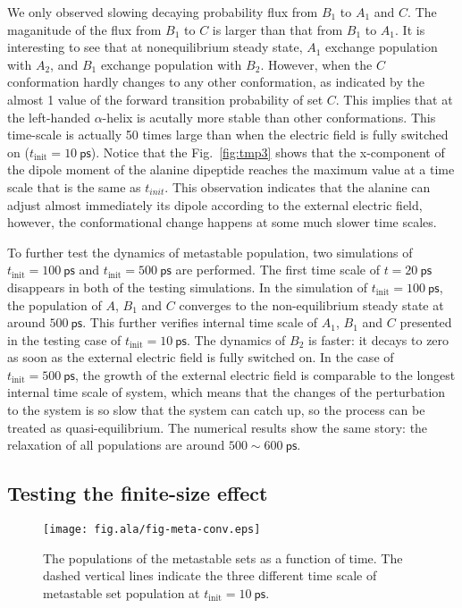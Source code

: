 \documentclass[aip,jcp,a4paper,preprint,onecolumn]{revtex4-1}
\begin{document}
We only observed slowing decaying probability flux from $B_1$ to $A_1$ and $C$.
The maganitude of the flux from $B_1$ to  $C$ is larger than that from  $B_1$ to  $A_1$.
It is interesting to see that at nonequilibrium steady state, $A_1$ exchange
population with $A_2$, and $B_1$ exchange
population with $B_2$. However, when the $C$ conformation hardly changes
to any other conformation, as indicated by the almost 1 value of the forward
transition probability of set $C$. This implies that at the left-handed $\alpha$-helix is
acutally more stable than  other conformations.
This time-scale is actually 50 times large than when the electric field
is fully switched on ($t_{\textrm{init}} = 10~\textsf{ps}$).
Notice that the Fig.~\ref{fig:tmp3}
shows that the x-component of the dipole moment of the alanine dipeptide
reaches the maximum value at a time scale  that is the same as
$t_{init}$. This observation indicates that the alanine can adjust almost immediately its
dipole according to the external electric field, however, the conformational change
happens at some much slower time scales.

To further test the dynamics of metastable population, two simulations
of $t_{\textrm{init}} = 100~\textsf{ps}$ and $t_{\textrm{init}} =
500~\textsf{ps}$ are performed. The first time scale of $t =
20~\textsf{ps}$ disappears in both of the testing simulations. In the
simulation of $t_{\textrm{init}} = 100~\textsf{ps}$, the population of
$A$, $B_1$ and $C$ converges to the non-equilibrium steady state at
around $500~\textsf{ps}$. This further verifies internal time scale of
$A_1$, $B_1$ and $C$ presented in the testing case of
$t_{\textrm{init}} = 10~\textsf{ps}$.  The dynamics of $B_2$ is
faster: it decays to zero as soon as the external electric field is fully
switched on. In the case of $t_{\textrm{init}} = 500~\textsf{ps}$, the
growth of the external electric field is comparable to the longest
internal time scale of system, which means that the changes of the
perturbation to the system is so slow that the system can catch up, so
the process can be treated as  quasi-equilibrium.
The numerical results show the same story: the relaxation
of all populations are around $500 \sim 600~\textsf{ps}$.


\subsection{Testing the finite-size effect}

\begin{figure}
  \centering
  \texttt{[image: fig.ala/fig-meta-conv.eps]}
  \caption{The populations of the metastable sets as a function of time.
    The dashed vertical lines indicate the three different time scale of
  metastable set population at $t_{\textrm{init}} = 10~\textsf{ps}$.}
  \label{fig:tmp7}
\end{figure}
\end{document}
